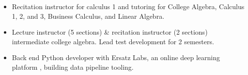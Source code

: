 \documentclass[10pt,a4paper,ragged2e]{altacv}
\begin{document}
\divider


\begin{itemize}
\item Recitation instructor for calculus 1 and tutoring for College Algebra, Calculus 1, 2, and 3, Business Calculus, and Linear Algebra.
\end{itemize}

\divider


\begin{itemize}
\item Lecture instructor (5 sections) {\&} recitation instructor (2 sections) intermediate college algebra. Lead test development for 2 semesters.
\end{itemize}
\divider


\begin{itemize}
\item Back end Python developer with Ersatz Labs, an online deep learning platform , building data pipeline tooling.
\end{itemize}




\nocite{mt}
\nocite{ut}
\nocite{wp}

\printbibliography[heading=none]

\divider

\end{document}
